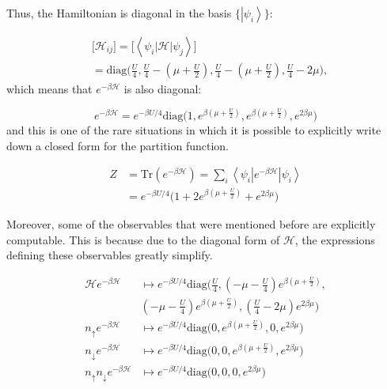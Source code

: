 Thus, the Hamiltonian is diagonal in the basis $\{\left| \psi_i \right\rangle \}$:

\begin{equation}
\begin{split}
&\bigg[ \mathcal{H}_{ij} \bigg] = \bigg[ \left\langle \psi_i \left| \mathcal{H} \right| \psi_j \right\rangle \bigg] \\
&= \text{diag}\bigg(\frac{U}{4}, \frac{U}{4} - (\mu + \frac{U}{2} ), \frac{U}{4} - (\mu + \frac{U}{2} ), \frac{U}{4} - 2 \mu \bigg) ,
\end{split}
\end{equation}
which means that $e^{-\beta \mathcal{H} }$ is also diagonal:

\begin{equation}
e^{-\beta \mathcal{H} } = e^{-\beta U / 4}  \text{diag}\bigg(1,  e^{\beta(\mu + \frac{U}{2})}, e^{\beta(\mu + \frac{U}{2})},  e^{2\beta \mu} \bigg)
\end{equation}
and this is one of the rare situations in which it is possible to explicitly write down a closed form for the partition function.

\begin{equation}
\begin{split}
Z &= \text{Tr} ( e^{-\beta\mathcal{H} } ) = \sum_i \left\langle \psi_i \left|e^{-\beta \mathcal{H} } \right| \psi_i \right\rangle \\
&= e^{-\beta U / 4} \bigg(1 + 2 e^{\beta(\mu + \frac{U}{2})} + e^{2 \beta \mu} \bigg)
\end{split}
\end{equation}

Moreover, some of the observables that were mentioned before are explicitly computable. This is because due to the diagonal form of $\mathcal{H}$, the expressions defining these observables greatly simplify.

\begin{equation}
\begin{split}
\mathcal{H} e^{-\beta\mathcal{H} } &\mapsto e^{-\beta U / 4}  \text{diag}\bigg(\frac{U}{4}, (-\mu - \frac{U}{4})  e^{\beta(\mu + \frac{U}{2})}, \\ 
&(-\mu - \frac{U}{4}) e^{\beta(\mu + \frac{U}{2})}, (\frac{U}{4} - 2\mu ) e^{2\beta \mu} \bigg) \\
n_{\uparrow} e^{-\beta\mathcal{H} } &\mapsto e^{-\beta U / 4}  \text{diag}\bigg(0, e^{\beta(\mu + \frac{U}{2})}, 0,  e^{2\beta \mu} \bigg) \\
n_{\downarrow} e^{-\beta\mathcal{H} } &\mapsto e^{-\beta U / 4}  \text{diag}\bigg(0, 0, e^{\beta(\mu + \frac{U}{2})},   e^{2\beta \mu} \bigg) \\
n_{\uparrow} n_{\downarrow} e^{-\beta\mathcal{H} } &\mapsto e^{-\beta U / 4}  \text{diag}\bigg(0, 0, 0,   e^{2\beta \mu} \bigg) \\
\end{split}
\end{equation}

